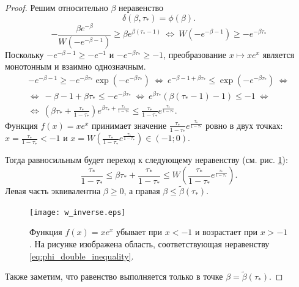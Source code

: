 \begin{proof}
	Решим относительно $\beta$ неравенство 
	\[
	\delta(\beta, \tau_*) = \phi(\beta).
	\]
	\[
	-\dfrac{\beta e^{-\beta}}{W(-e^{-\beta - 1})} \geqslant \beta e^{\beta(\tau_* - 1)}\ \Leftrightarrow\ W(-e^{-\beta - 1}) \geqslant -e^{-\beta\tau_*}
	\]
	Поскольку $-e^{-\beta - 1} \geqslant -e^{-1}$ и $-e^{-\beta\tau_*} \geqslant -1$, преобразование $x \mapsto x e^x$ является монотонным и взаимно однозначным.
	\begin{multline*}
		-e^{-\beta - 1} \geqslant -e^{-\beta\tau_*}\exp(-e^{-\beta\tau_*})\ \Leftrightarrow\ e^{-\beta - 1 + \beta\tau_*} \leqslant \exp(-e^{-\beta\tau_*})\ \Leftrightarrow
		\\
		\Leftrightarrow\ -\beta - 1 + \beta\tau_* \leqslant -e^{-\beta \tau_*}\ \Leftrightarrow \ e^{\beta \tau_*}(\beta(\tau_* - 1) - 1) \leqslant -1\ \Leftrightarrow
		\\
		\Leftrightarrow\ \left(\beta \tau_* + \frac{\tau_*}{1 - \tau_*}\right) e^{\beta \tau_* + \frac{\tau_*}{1 - \tau_*}} \leqslant \frac{\tau_*}{1 - \tau_*} e^{\frac{\tau_*}{1 - \tau_*}}.
	\end{multline*}
	Функция $f(x) = x e^x$ принимает значение $\frac{\tau_*}{1 - \tau_*} e^{\frac{\tau_*}{1 - \tau_*}}$ ровно в двух точках: $x = \frac{\tau_*}{1 - \tau_*} < -1$ и $x = W\left(\frac{\tau_*}{1 - \tau_*} e^{\frac{\tau_*}{1 - \tau_*}}\right) \in (-1; 0)$.
	
	Тогда равносильным будет переход к следующему неравенству (см. рис. \ref{fig:w_inverse}):
	\begin{equation}
		\label{eq:phi_double_inequality}
		\frac{\tau_*}{1 - \tau_*} \leqslant \beta \tau_* + \frac{\tau_*}{1 - \tau_*} \leqslant  W\left(\frac{\tau_*}{1 - \tau_*} e^{\frac{\tau_*}{1 - \tau_*}}\right).
	\end{equation}
	Левая часть эквивалентна $\beta \geqslant 0$, а правая $\beta \leqslant \tilde{\beta}(\tau_*)$.
	\begin{figure}[ht]
		\centering
		\texttt{[image: w\_inverse.eps]}
		\caption{Функция $f(x) = x e^x$ убывает при $x < -1$ и возрастает при $x > -1$. На рисунке изображена область, соответствующая неравенству \eqref{eq:phi_double_inequality}.}
		\label{fig:w_inverse}
	\end{figure}
	
	Также заметим, что равенство выполняется только в точке $\beta = \tilde{\beta}(\tau_*)$.
	
\end{proof}

